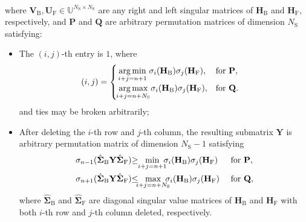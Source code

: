 \documentclass[
	fontsize=11pt,
	paper=a4,
	foldmarks=false
]{scrartcl}
\begin{document}
\begin{reviewer}
{{\begin{corollary}
\begin{align*}
				\end{align*}
				where $\mathbf{V}_\mathrm{B}, \mathbf{U}_\mathrm{F} \in \mathbb{U}^{N_\mathrm{S} \times N_\mathrm{S}}$ are any right and left singular matrices of $\mathbf{H}_\mathrm{B}$ and $\mathbf{H}_\mathrm{F}$, respectively,
				and $\mathbf{P}$ and $\mathbf{Q}$ are arbitrary permutation matrices of dimension $N_\mathrm{S}$ satisfying:
				\begin{itemize}
					\item The $(i, j)$-th entry is $1$, where
					\begin{align*}
						(i, j) &=
						\begin{cases}
							\underset{\mathclap{i+j=n+1}}{\arg\min} \ \sigma_i(\mathbf{H}_\mathrm{B}) \sigma_j(\mathbf{H}_\mathrm{F}), & \text{for } \mathbf{P}, \\
							\underset{\mathclap{i+j=n+N_\mathrm{S}}}{\arg\max} \ \sigma_i(\mathbf{H}_\mathrm{B}) \sigma_j(\mathbf{H}_\mathrm{F}), & \text{for } \mathbf{Q}.
						\end{cases}
					\end{align*}
					and ties may be broken arbitrarily;
					\item After deleting the $i$-th row and $j$-th column, the resulting submatrix $\mathbf{Y}$ is arbitrary permutation matrix of dimension $N_\mathrm{S}-1$ satisfying
					\begin{alignat*}{2}
						\sigma_{n{-}1}(\hat{\mathbf{\Sigma}}_{\mathrm{B}} \mathbf{Y} \hat{\mathbf{\Sigma}}_{\mathrm{F}}) & {\ge} \ \ \min_{\mathclap{i+j=n+1}} \ \sigma_i(\mathbf{H}_\mathrm{B}) \sigma_j(\mathbf{H}_\mathrm{F})            &  & \text{ for } \mathbf{P}, \\
						\sigma_{n{+}1}(\hat{\mathbf{\Sigma}}_{\mathrm{B}} \mathbf{Y} \hat{\mathbf{\Sigma}}_{\mathrm{F}}) & {\le} \ \ \max_{\mathclap{i+j=n+N_\mathrm{S}}} \ \sigma_i(\mathbf{H}_\mathrm{B}) \sigma_j(\mathbf{H}_\mathrm{F}) &  & \text{ for } \mathbf{Q},
					\end{alignat*}
					where $\hat{\mathbf{\Sigma}}_{\mathrm{B}}$ and $\hat{\mathbf{\Sigma}}_{\mathrm{F}}$ are diagonal singular value matrices of $\mathbf{H}_\mathrm{B}$ and $\mathbf{H}_\mathrm{F}$ with both $i$-th row and $j$-th column deleted, respectively.

\end{itemize}
\end{corollary}}}
\end{reviewer}
\end{document}
